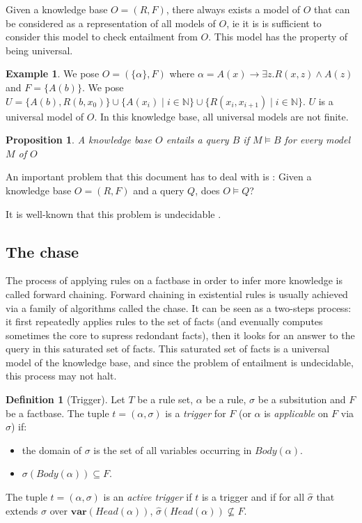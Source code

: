 \documentclass{article}
\newtheorem{proposition}{Proposition}[section]
\theoremstyle{definition}
\newtheorem{definition}{Definition}[section]
\newtheorem{example}{Example}[section]
\theoremstyle{remark}
\def \N {\mathbb N}
\begin{document}
Given a knowledge base $O=(R,F)$, there always exists a model of $O$ that can be considered as a representation of all models of $O$, ie it is  is  sufficient  to  consider this model to check entailment from $O$. This model has the property of being universal.

\begin{example} We pose $O = (\{\alpha\},F)$ where $\alpha = A(x) \rightarrow \exists z.R(x,z) \wedge A(z)$ and $F = \{A(b)\}$. We pose $U = \{A(b),R(b,x_0)\}\cup \{A(x_i)\mid i \in \N\}\cup \{R(x_i,x_{i+1}) \mid i \in \N\}$. $U$ is a universal model of $O$. In this knowledge base, all universal models are not finite.
\end{example}

\begin{proposition}
A knowledge base $O$ entails a query $B$ if $M \models B$ for every model $M$ of $O$
\end{proposition}

An important problem that this document has to deal with is : Given a knowledge base $O=(R,F)$ and a query $Q$,  does $O \models Q$?

It  is  well-known  that  this  problem  is  undecidable .



\subsection{The chase}

The process of applying rules on a factbase in order to infer more knowledge is called forward chaining.   Forward  chaining  in  existential  rules  is  usually achieved  via  a  family  of  algorithms  called the  chase. It can be seen as a two-steps process: it first repeatedly applies rules to the set of facts (and evenually computes sometimes the core to supress redondant facts), then it looks for an answer to the query in this saturated set of facts. This saturated set of facts is a universal model of the knowledge base, and since the problem of entailment is undecidable, this process may not halt.

\begin{definition}[Trigger]
Let $T$ be a rule set, $\alpha$ be a rule, $\sigma$ be a subsitution and $F$ be a factbase. The tuple $t = (\alpha,\sigma)$ is a \emph{trigger} for $F$ (or $\alpha$ is \emph{applicable} on $F$ via $\sigma$) if: 
\begin{itemize}
\item the domain of $\sigma$ is the set of all variables occurring in $Body(\alpha)$.
\item $\sigma(Body(\alpha)) \subseteq F$.
\end{itemize}
The tuple $t = (\alpha,\sigma)$ is an \emph{active trigger} if $t$ is a trigger and if for all $\hat \sigma$ that extends $\sigma$ over $\textbf{var}(\textit{Head}(\alpha))$, $\hat \sigma(Head(\alpha)) \nsubseteq F$.

\end{definition} 
\end{document}

